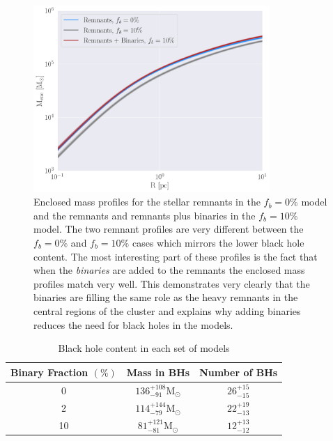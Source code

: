 \begin{figure}
	\centering
	\includegraphics[width=0.8\textwidth]{figures/mass_enc_comp.png}
	\caption{Enclosed mass profiles for the stellar remnants in the $f_b =0\%$ model and the
		remnants and remnants plus binaries in the $f_b =10\%$ model. The two remnant
		profiles are very different between the $f_b = 0\%$ and $f_b = 10\%$ cases which
		mirrors the lower black hole content. The most interesting part of these profiles is
		the fact that when the \emph{binaries} are added to the remnants the enclosed mass
		profiles match very well. This demonstrates very clearly that the binaries are
		filling the same role as the heavy remnants in the central regions of the cluster
		and explains why adding binaries reduces the need for black holes in the models.}
	\label{fig:mass_enc_comp}
\end{figure}


\begin{table}
	\centering
	\caption{Black hole content in each set of models}
	\begin{tabular}{c c c}
		\hline
		Binary Fraction $(\%)$ & Mass in BHs                         & Number of BHs    \\
		\hline
		0                      & $136^{+108}_{-91} \mathrm{M}_\odot$ & $26^{+15}_{-15}$ \\
		2                      & $114^{+144}_{-79} \mathrm{M}_\odot$ & $22^{+19}_{-13}$ \\
		10                     & $81 ^{+121}_{-81} \mathrm{M}_\odot$ & $12^{+13}_{-12}$ \\
		\hline
	\end{tabular}
	\label{tab:BH_contents}
\end{table}


